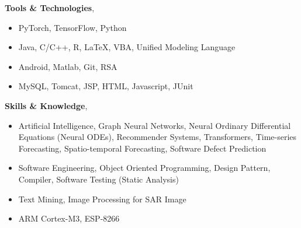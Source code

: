 \documentclass[10pt]{article}
\newenvironment{changemargin}[2]{
  \begin{list}{}{
    \setlength{\topsep}{0pt}
    \setlength{\leftmargin}{#1}
    \setlength{\rightmargin}{#2}
    \setlength{\listparindent}{\parindent}
    \setlength{\itemindent}{\parindent}
    \setlength{\parsep}{\parskip}
  }
  \item[]}{\end{list}
}
\newcommand{\labdescription}[1]{
	\begin{changemargin}{0.15in}{0.15in}
    \smallskip
		{#1}
    \medskip
	\end{changemargin}
}
\newcommand{\labtitle}[3]{
	\textbf{#1}, \emph{#2} \hfill \emph{#3}\\
}
\newenvironment{body} {
	\vspace*{-16pt}
	\begin{changemargin}{-0.25in}{-0.5in}
  }
	{\end{changemargin}
}
\begin{document}
\begin{body}
	\vspace{14pt}
  	\labtitle{Tools \& Technologies}{}{}
  \labdescription {
  	\begin{itemize} \itemsep -0pt  %
      \item PyTorch, TensorFlow, Python
      \item Java, C/C++, R, LaTeX, VBA, Unified Modeling Language
      \item Android, Matlab, Git, RSA
      \item MySQL, Tomcat, JSP, HTML, Javascript, JUnit
  	\end{itemize}
  }
  	\labtitle{Skills \& Knowledge}{}{}
  \labdescription {
  	\begin{itemize} \itemsep -0pt  %
      \item Artificial Intelligence, Graph Neural Networks, Neural Ordinary Differential Equations (Neural ODEs), Recommender Systems, Transformers, Time-series Forecasting, Spatio-temporal Forecasting, Software Defect Prediction
      \item Software Engineering, Object Oriented Programming, Design Pattern, Compiler, Software Testing (Static Analysis)
      \item Text Mining, Image Processing for SAR Image
      \item ARM Cortex-M3, ESP-8266
  	\end{itemize}
  }

\end{body}

\medskip
\clearpage
\end{document}
